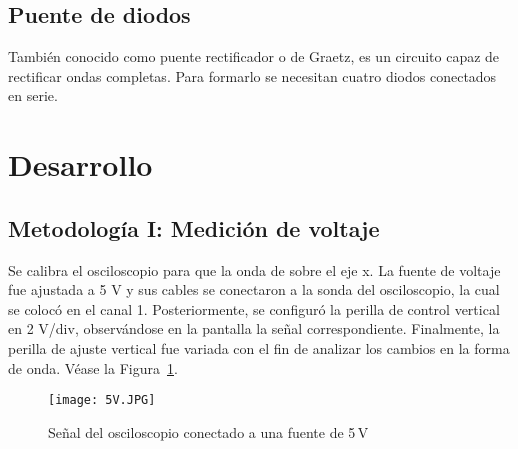 \documentclass[conference]{IEEEtran} %
\begin{document}
\subsection{Puente de diodos}
También conocido como puente rectificador o de Graetz, es un circuito capaz de rectificar ondas completas. Para formarlo se necesitan cuatro diodos conectados en serie.~\cite{puenteDiodos}


\section{Desarrollo}
\subsection{Metodología I: Medición de voltaje}
Se calibra el osciloscopio para que la onda de sobre el eje x.
La fuente de voltaje fue ajustada a 5 V y sus cables se conectaron a la sonda del osciloscopio, la cual se colocó en el canal 1. Posteriormente, se configuró la perilla de control vertical en 2 V/div, observándose en la pantalla la señal correspondiente. Finalmente, la perilla de ajuste vertical fue variada con el fin de analizar los cambios en la forma de onda. Véase la Figura~\ref{fig:senal-5v}.
\begin{figure}[htbp]
    \centering
    \texttt{[image: 5V.JPG]}
    \caption{Señal del osciloscopio conectado a una fuente de 5\,V}
    \label{fig:senal-5v}
\end{figure}
\end{document}
